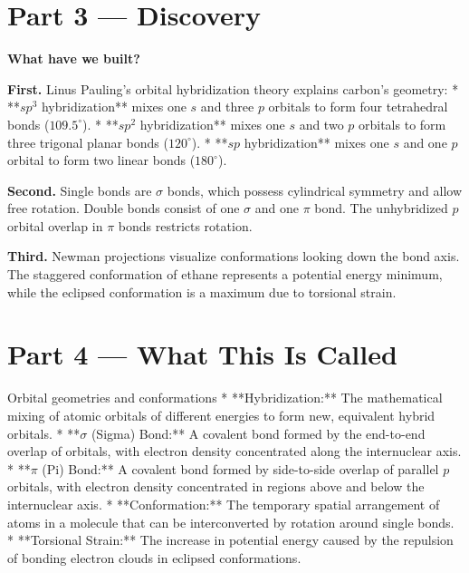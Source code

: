 \documentclass[12pt, a4paper]{book}
\begin{document}
\newpage

\section{Part 3 --- Discovery}

\begin{discoverybox}
\textbf{What have we built?}

\textbf{First.} Linus Pauling's orbital hybridization theory explains carbon's geometry:
* **$sp^3$ hybridization** mixes one $s$ and three $p$ orbitals to form four tetrahedral bonds ($109.5^\circ$).
* **$sp^2$ hybridization** mixes one $s$ and two $p$ orbitals to form three trigonal planar bonds ($120^\circ$).
* **$sp$ hybridization** mixes one $s$ and one $p$ orbital to form two linear bonds ($180^\circ$).

\textbf{Second.} Single bonds are $\sigma$ bonds, which possess cylindrical symmetry and allow free rotation. Double bonds consist of one $\sigma$ and one $\pi$ bond. The unhybridized $p$ orbital overlap in $\pi$ bonds restricts rotation.

\textbf{Third.} Newman projections visualize conformations looking down the bond axis. The staggered conformation of ethane represents a potential energy minimum, while the eclipsed conformation is a maximum due to torsional strain.
\end{discoverybox}

\newpage

\section{Part 4 --- What This Is Called}

\begin{namedconcept}{Orbital geometries and conformations}
* **Hybridization:** The mathematical mixing of atomic orbitals of different energies to form new, equivalent hybrid orbitals.
* **$\sigma$ (Sigma) Bond:** A covalent bond formed by the end-to-end overlap of orbitals, with electron density concentrated along the internuclear axis.
* **$\pi$ (Pi) Bond:** A covalent bond formed by side-to-side overlap of parallel $p$ orbitals, with electron density concentrated in regions above and below the internuclear axis.
* **Conformation:** The temporary spatial arrangement of atoms in a molecule that can be interconverted by rotation around single bonds.
* **Torsional Strain:** The increase in potential energy caused by the repulsion of bonding electron clouds in eclipsed conformations.
\end{namedconcept}
\end{document}
